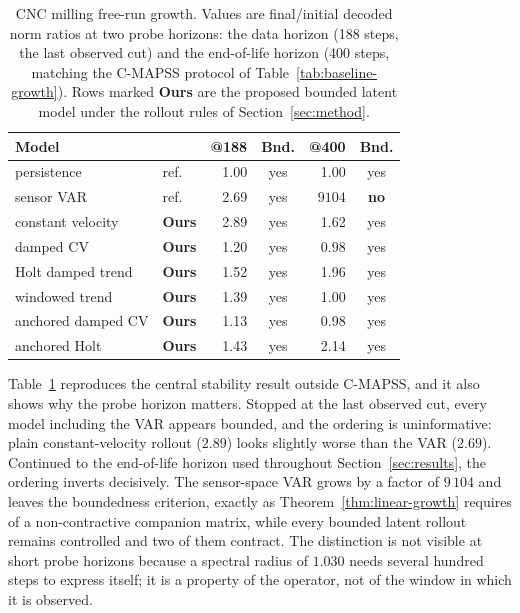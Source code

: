 \documentclass[a4paper,fleqn]{cas-sc}
\newcommand{\tinytable}{\scriptsize}
\newcommand{\verytighttables}{%
  \setlength{\tabcolsep}{3.5pt}%
  \renewcommand{\arraystretch}{1.05}%
}
\begin{document}
\begin{table}[t]
\centering
\caption{CNC milling free-run growth. Values are final/initial decoded norm
ratios at two probe horizons: the data horizon (188 steps, the last observed
cut) and the end-of-life horizon (400 steps, matching the C-MAPSS protocol of
Table~\ref{tab:baseline-growth}). Rows marked \textbf{Ours} are the proposed
bounded latent model under the rollout rules of Section~\ref{sec:method}.}
\label{tab:milling-growth}
\tinytable
\verytighttables
\begin{tabular}{@{}llrcrc@{}}
\toprule
Model & & @188 & Bnd. & @400 & Bnd. \\
\midrule
persistence        & ref.            & 1.00 & yes & 1.00      & yes \\
sensor VAR         & ref.            & 2.69 & yes & $9104$    & \textbf{no} \\
\midrule
constant velocity  & \textbf{Ours} & 2.89 & yes & 1.62      & yes \\
damped CV          & \textbf{Ours} & 1.20 & yes & 0.98      & yes \\
Holt damped trend  & \textbf{Ours} & 1.52 & yes & 1.96      & yes \\
windowed trend     & \textbf{Ours} & 1.39 & yes & 1.00      & yes \\
anchored damped CV & \textbf{Ours} & 1.13 & yes & 0.98      & yes \\
anchored Holt      & \textbf{Ours} & 1.43 & yes & 2.14      & yes \\
\bottomrule
\end{tabular}
\end{table}

Table~\ref{tab:milling-growth} reproduces the central stability result outside
C-MAPSS, and it also shows why the probe horizon matters. Stopped at the last
observed cut, every model including the VAR appears bounded, and the ordering is
uninformative: plain constant-velocity rollout ($2.89$) looks slightly worse
than the VAR ($2.69$). Continued to the end-of-life horizon used throughout
Section~\ref{sec:results}, the ordering inverts decisively. The sensor-space
VAR grows by a factor of $9\,104$ and leaves the boundedness criterion, exactly
as Theorem~\ref{thm:linear-growth} requires of a non-contractive companion
matrix, while every bounded latent rollout remains controlled and two of them
contract. The distinction is not visible at short probe horizons because a
spectral radius of $1.030$ needs several hundred steps to express itself; it is
a property of the operator, not of the window in which it is observed.
\end{document}
